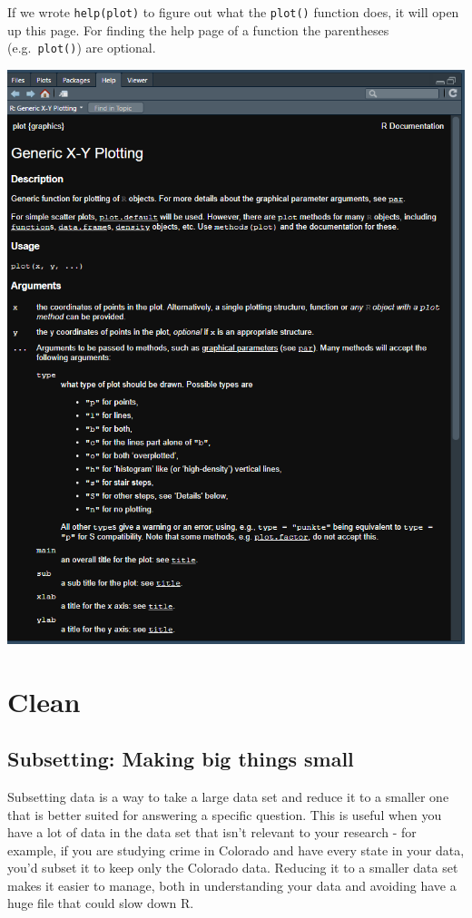 \documentclass[
  12pt,
]{book}
\begin{document}
If we wrote \texttt{help(plot)} to figure out what the \texttt{plot()} function does, it will open up this page. For finding the help page of a function the parentheses (e.g.~\texttt{plot()}) are optional.

\includegraphics{images/help_page.PNG}

\hypertarget{part-clean}{%
\part{Clean}\label{part-clean}}

\hypertarget{subsetting-intro}{%
\chapter{Subsetting: Making big things small}\label{subsetting-intro}}

Subsetting data is a way to take a large data set and reduce it to a smaller one that is better suited for answering a specific question. This is useful when you have a lot of data in the data set that isn't relevant to your research - for example, if you are studying crime in Colorado and have every state in your data, you'd subset it to keep only the Colorado data. Reducing it to a smaller data set makes it easier to manage, both in understanding your data and avoiding have a huge file that could slow down R.
\end{document}
